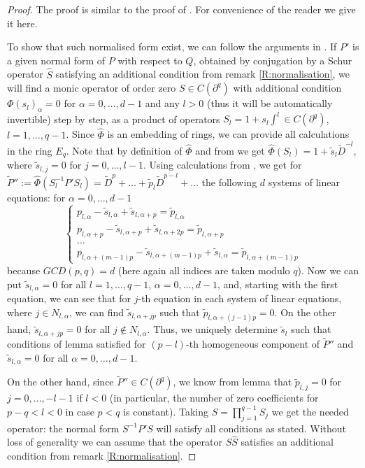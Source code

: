 \documentclass[11pt]{article}
\theoremstyle{definition}
\theoremstyle{plain}
\numberwithin{equation}{section}
\begin{document}
\begin{proof}
The proof is similar to the proof of \cite[Lem. 3.4]{GZ24}. For convenience of the reader we give it here.

To show that such normalised form exist, we can follow the arguments in \cite[Lem. 3.3]{GZ24}. If $P'$ is a given normal form of $P$ with respect to $Q$, obtained by conjugation by a Schur operator $\hat{S}$ satisfying an additional condition from remark \ref{R:normalisation}, we will find a monic operator of order zero $S\in C(\partial^q)$ with additional condition $\Phi (s_{l})_{\alpha}=0$ for $\alpha = 0, \ldots , d-1$ and any $l>0$ (thus it will be automatically invertible) step by step, as a product of operators $S_l=1+s_l \int^{l}\in C(\partial^q)$, $l=1,\ldots ,q-1$. Since $\hat{\Phi}$ is an embedding of rings, we can provide all calculations in the ring $E_q$. Note that by definition of $\hat{\Phi}$ and from \cite[Lem. 2.4]{GZ24} we get $\hat{\Phi}(S_l)=1+\tilde{s}_l \tilde{D}^{-l}$, where $\tilde{s}_{l,j}=0$ for $j=0, \ldots , l-1$. Using calculations from \cite[Lem. 3.3]{GZ24}, we get for 
$\tilde{P}'':=\hat{\Phi}(S_l^{-1}P'S_l)= \tilde{D}^p+\ldots + \tilde{p}_l\tilde{D}^{p-l}+\ldots$ 
the following $d$  systems of linear equations: for $\alpha =0, \ldots ,d-1$ 
$$
\begin{cases}
p_{l,\alpha }-\tilde{s}_{l,\alpha}+\tilde{s}_{l,\alpha +p}=\tilde{p}_{l,\alpha} \\
p_{l,\alpha +p}-\tilde{s}_{l,\alpha +p}+\tilde{s}_{l,\alpha +2p}=\tilde{p}_{l,\alpha +p} \\
\ldots \\
p_{l,\alpha +(m-1)p}-\tilde{s}_{l,\alpha +(m-1)p}+\tilde{s}_{l,\alpha}=\tilde{p}_{l,\alpha+(m-1)p}
\end{cases}
$$ 
because $GCD(p,q)=d$ (here again all indices are taken modulo $q$). Now we can put $\tilde{s}_{l,\alpha}=0$ for all $l=1,\ldots ,q-1$, $\alpha =0, \ldots ,d-1$, and, starting with the first equation, we can see that for $j$-th equation in each system of linear equations, where $j\in N_{l,\alpha }$, we can find $\tilde{s}_{l,\alpha + jp}$ such that $\tilde{p}_{l,\alpha + (j-1)p}=0$. On the other hand, $\tilde{s}_{l,\alpha + jp}=0$ for all $j\notin N_{l,\alpha }$. Thus, we uniquely determine $\tilde{s}_l$ such that conditions of lemma satisfied for $(p-l)$-th homogeneous component of $\tilde{P}''$ and $\tilde{s}_{l,\alpha}=0$ for all $\alpha =0, \ldots ,d-1$. 

On the other hand, since $\tilde{P}''\in C(\partial^q)$, we know from lemma \cite[Lem. 2.4]{GZ24} that  $\tilde{p}_{l,j}=0$ for $j=0,\ldots , -l-1$ if $l<0$ (in particular, the number of zero coefficients for $p-q<l<0$ in case $p<q$ is constant). Taking $S=\prod_{j=1}^{q-1}S_j$ we get the needed operator: the normal form $S^{-1}P'S$ will satisfy all conditions as stated. Without loss of generality we can assume that the operator $S\hat{S}$ satisfies an additional condition from remark \ref{R:normalisation}.


\end{proof}
\end{document}
